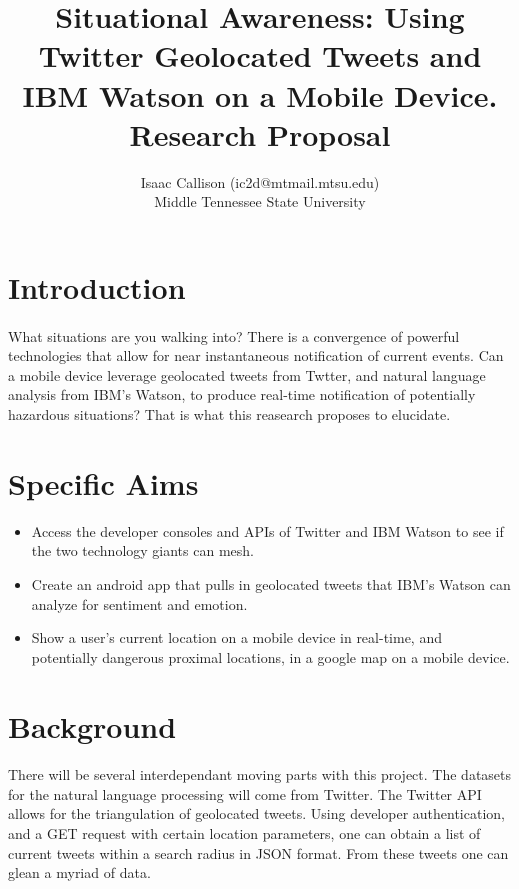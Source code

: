 \documentclass[12pt, oneside]{article}
\title{Situational Awareness: Using Twitter Geolocated Tweets and IBM Watson on a Mobile Device.
\\\medskip Research Proposal}
\author{Isaac Callison (ic2d@mtmail.mtsu.edu)\\Middle Tennessee State University}
\begin{document}
\maketitle
\nocite{*}
\newpage{}

\section{Introduction}
\paragraph{}
What situations are you walking into? There is a convergence of powerful
technologies that allow for near instantaneous notification of current events.
Can a mobile device leverage geolocated tweets from Twtter, and natural language analysis from
IBM's Watson, to produce real-time notification of potentially hazardous
situations? That is what this reasearch proposes to elucidate.

\section{Specific Aims}
\begin{itemize}
 \item Access the developer consoles and APIs of Twitter and IBM Watson to see
 if the two technology giants can mesh.

 \item Create an android app that pulls in geolocated tweets that IBM's Watson
 can analyze for sentiment and emotion.

 \item Show a user's current location on a mobile device in real-time, and potentially dangerous proximal locations, in a google map on a mobile device.

\end{itemize}

\section{Background}
\paragraph{}
There will be several interdependant moving parts with this project. The datasets for the natural language processing will come from Twitter. The
Twitter API allows for the triangulation of geolocated tweets\cite{TwitterGeo}.
Using developer authentication, and a GET request with certain location parameters, one can obtain a list of current tweets within a search radius in JSON format. From these tweets one can glean a myriad of data.
\end{document}
